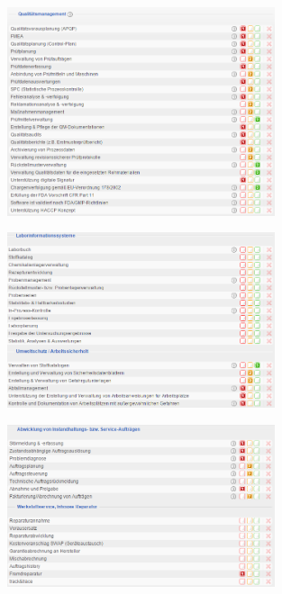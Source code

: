 \documentclass[12pt]{article}
\begin{document}
\noindent
\begin{figure}[here!]
\centering
\includegraphics[width=0.7\textwidth]{images/tr27}
\end{figure}\FloatBarrier
\noindent
\begin{figure}[here!]
\centering
\includegraphics[width=0.7\textwidth]{images/tr28}
\end{figure}\FloatBarrier
\noindent
\begin{figure}[here!]
\centering
\includegraphics[width=0.7\textwidth]{images/tr29}
\end{figure}\FloatBarrier
\noindent
\end{document}
